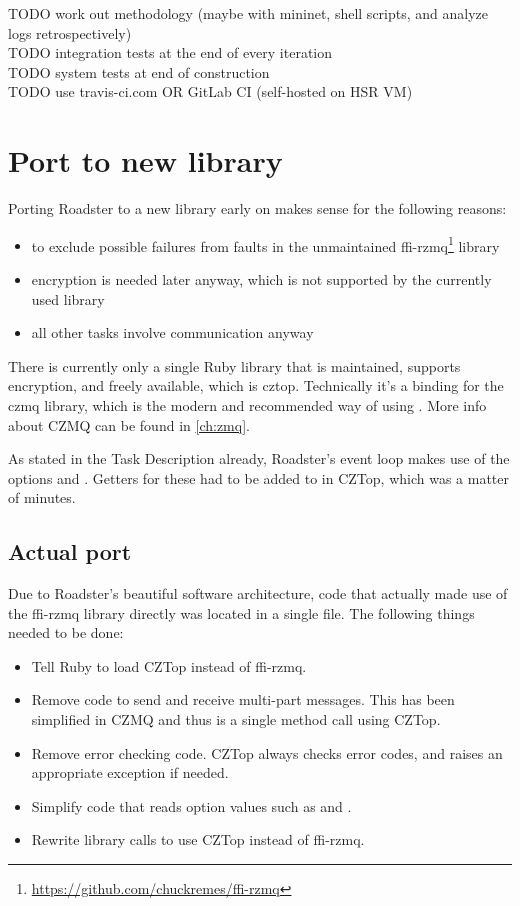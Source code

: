 TODO work out methodology (maybe with mininet, shell scripts, and analyze logs retrospectively)\\
TODO integration tests at the end of every iteration\\
TODO system tests at end of construction\\
TODO use travis-ci.com OR GitLab CI (self-hosted on HSR VM)\\

\section{Port to new \zmq library}\label{sec:meth:port}
Porting Roadster to a new \zmq library early on makes sense for the following reasons:

\begin{itemize}
\item to exclude possible failures from faults in the unmaintained ffi-rzmq\footnote{\url{https://github.com/chuckremes/ffi-rzmq}} library
\item encryption is needed later anyway, which is not supported by the currently used library
\item all other tasks involve \zmq communication anyway
\end{itemize}

There is currently only a single Ruby library that is maintained, supports
encryption, and freely available, which is \gls{cztop}. Technically it's a
binding for the \gls{czmq} library, which is the modern and recommended way of
using \zmq. More info about CZMQ can be found in \autoref{ch:zmq}.

As stated in the Task Description already, Roadster's event loop makes use of
the \zmq options  and . Getters for these had to be
added to in CZTop, which was a matter of minutes.

\subsection{Actual port}
Due to Roadster's beautiful software architecture, code that actually made use
of the ffi-rzmq library directly was located in a single file. The following
things needed to be done:

\begin{itemize}
\item Tell Ruby to load CZTop instead of ffi-rzmq.
\item Remove code to send and receive multi-part messages. This has been simplified
in CZMQ and thus is a single method call using CZTop.
\item Remove error checking code. CZTop always checks error codes, and raises
an appropriate exception if needed.
\item Simplify code that reads option values such as  and .
\item Rewrite library calls to use CZTop instead of ffi-rzmq.
\end{itemize}

